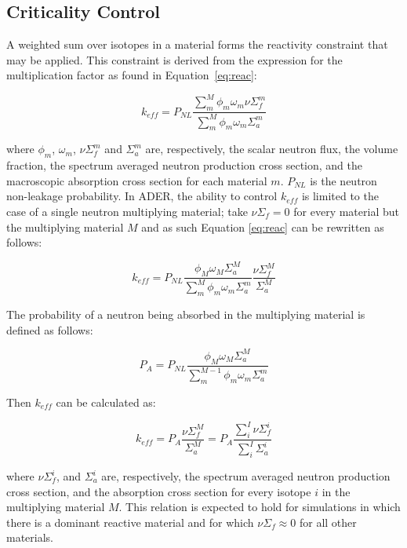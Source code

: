 \subsection{Criticality Control}\label{ssec:t_crit}
A weighted sum over isotopes in a material forms the reactivity constraint that
may be applied. This constraint is derived from the expression for the 
multiplication factor as found in Equation~\ref{eq:reac}:

\begin{equation}
\label{eq:reac}
k_{eff} = P_{NL} \frac{\sum\limits^{M}_{m}\phi_m\omega_m\nu\Sigma_{f}^{m}}
{\sum\limits^{M}_{m}\phi_m\omega_m   \Sigma_{a}^{m}}
\end{equation}

where $\phi_m$, $\omega_m$, $ \nu\Sigma_{f}^{m}$ and $ \Sigma_{a}^{m}$ are, 
respectively, the scalar neutron flux, the volume fraction, the spectrum 
averaged neutron production cross section, and the macroscopic absorption 
cross section for each material $m$. $P_{NL}$ is the neutron non-leakage 
probability. In ADER, the ability to control $k_{eff}$ is limited to the 
case of a single neutron multiplying material; take $\nu\Sigma_{f}=0$ for 
every material but the multiplying material $M$ and as such 
Equation \ref{eq:reac} can be rewritten as follows:

\begin{equation}
\label{eq:reac_one_material}
k_{eff} = P_{NL} \frac{\phi_M\omega_{M}\Sigma_{a}^{M}}{\sum\limits^{M}_{m}\phi_m
\omega_m \Sigma_{a}^{m}} \frac{\nu\Sigma_{f}^{M}}{\Sigma_{a}^{M}}
\end{equation}

The probability of a neutron being absorbed in the multiplying material is 
defined as follows:

\begin{equation}
\label{eq:abs_prob}
P_{A} = P_{NL} \frac{\phi_M\omega_{M}\Sigma_{a}^{M}} {\sum\limits^{M-1}_{m}
\phi_{m}\omega_m\Sigma_{a}^{m}}
\end{equation}

Then $k_{eff}$ can be calculated as:

\begin{equation}
\label{eq:reac_modified}
k_{eff} = P_{A} \frac{\nu\Sigma_{f}^{M}}{\Sigma_{a}^{M}} = P_{A} 
\frac{\sum\limits^{I}_{i}\nu\Sigma_{f}^{i}}{\sum\limits^{I}_{i}\Sigma_{a}^{i}}
\end{equation}

where $\nu\Sigma_{f}^i$, and $\Sigma_{a}^i$ are, respectively, the spectrum 
averaged neutron production cross section, and the absorption cross 
section for every isotope $i$ in the multiplying material $M$. 
This relation is expected to hold for simulations in which there
is a dominant reactive material and for which $\nu\Sigma_{f} \approx 0$ for 
all other materials.

